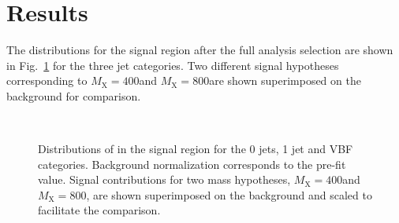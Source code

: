 \section{Results}\label{chap6:Results}

The \mti{} distributions for the signal region after the full analysis selection
are shown in Fig.~\ref{fig:13TeVmTishapes} for the three jet categories.
 Two different signal hypotheses corresponding to $M_\mathrm{X} = 400$\GeV and
 $M_\mathrm{X} = 800$\GeV are shown superimposed on the background for comparison.

\begin{figure}[!htb]
\centering
{}
\\
\caption{
    Distributions of \mti{} in the signal region for the 0 jets, 1 jet and VBF categories. Background normalization corresponds to the pre-fit value. Signal contributions for two mass hypotheses, $M_\mathrm{X} = 400$\GeV and $M_\mathrm{X} = 800$\GeV, are shown superimposed on the background and scaled to facilitate the comparison.}
    \label{fig:13TeVmTishapes}
\end{figure}

